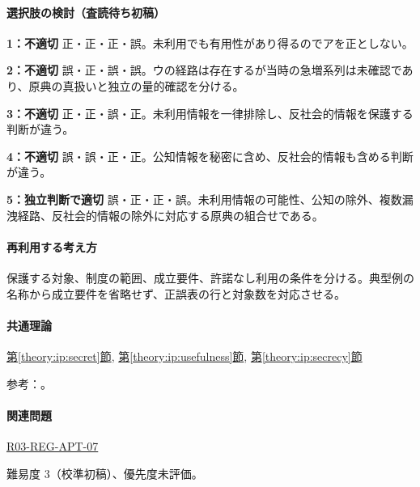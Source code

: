 \paragraph{選択肢の検討（査読待ち初稿）}\mbox{}\par

\noindent\textbf{1：不適切} 正・正・正・誤。未利用でも有用性があり得るのでアを正としない。\par

\noindent\textbf{2：不適切} 誤・正・誤・誤。ウの経路は存在するが当時の急増系列は未確認であり、原典の真扱いと独立の量的確認を分ける。\par

\noindent\textbf{3：不適切} 正・正・誤・正。未利用情報を一律排除し、反社会的情報を保護する判断が違う。\par

\noindent\textbf{4：不適切} 誤・誤・正・正。公知情報を秘密に含め、反社会的情報も含める判断が違う。\par

\noindent\textbf{5：独立判断で適切} 誤・正・正・誤。未利用情報の可能性、公知の除外、複数漏洩経路、反社会的情報の除外に対応する原典の組合せである。\par

\paragraph{再利用する考え方} 保護する対象、制度の範囲、成立要件、許諾なし利用の条件を分ける。典型例の名称から成立要件を省略せず、正誤表の行と対象数を対応させる。

\paragraph{共通理論} \hyperref[theory:ip:secret]{第\ref*{theory:ip:secret}節}, \hyperref[theory:ip:usefulness]{第\ref*{theory:ip:usefulness}節}, \hyperref[theory:ip:secrecy]{第\ref*{theory:ip:secrecy}節}

\par 参考：\cite{ip_unfair_statute,ip_secret_handbook2017,ip_secret_commentary2018}。

\paragraph{関連問題} \hyperref[q:r03-reg-apt-07]{R03-REG-APT-07}

\par 難易度 3（校準初稿）、優先度未評価。

